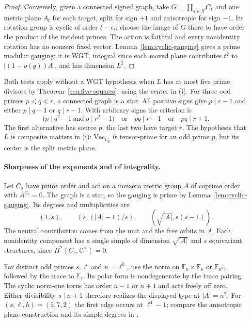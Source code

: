 \documentclass[11pt,a4paper]{article}
\numberwithin{equation}{section}
\theoremstyle{remark}
\renewcommand{\Vec}{\mathrm{Vec}}
\newcommand{\CC}{\mathbb C}
\begin{document}
\begin{proof}
Conversely, given a connected signed graph, take
$G=\prod_{s\in S}C_s$ and one metric plane $A_t$ for each target,
split for sign $+1$ and anisotropic for sign $-1$. Its rotation
group is cyclic of order $t-\epsilon_t$; choose the image of $G$
there to have order the product of the incident primes.
The action is faithful and every nonidentity rotation has no nonzero
fixed vector. Lemma~\ref{lem:cyclic-gauging} gives a prime modular
gauging; it is WGT, integral since each moved plane contributes
$t^2$ to $|(1-\rho(g))A|$, and has dimension $L^2$.
\end{proof}

Both tests apply without a WGT hypothesis when $L$ has at most five
prime divisors by Theorem~\ref{seq:five-squares}, using the center
in (i). For three odd primes $p<q<r$, a connected graph is a star.
All positive signs give $p\mid r-1$ and either $p\mid q-1$ or
$q\mid r-1$. With arbitrary signs the criterion is
\[
 \bigl(p\mid q^2-1\ \text{and}\ p\mid r^2-1\bigr)
 \quad\text{or}\quad pq\mid r-1\quad\text{or}\quad pq\mid r+1 .
\]
The first alternative has source $p$; the last two have target $r$.
The hypothesis that $L$ is composite matters in (i):
$\Vec_{C_p}$ is tensor-prime for an odd prime $p$, but its center is
the split metric plane.

\paragraph{Sharpness of the exponents and of integrality.}
Let $C_s$ have prime order and act on a nonzero metric group $A$ of
coprime order with $A^{C_s}=0$. The graph is a star, so the gauging
is prime by Lemma~\ref{lem:cyclic-gauging}. Its degrees and multiplicities are
\[
 (1,s),\qquad (s,(|A|-1)/s),\qquad (\sqrt{|A|},s(s-1)).
\]
The neutral contribution comes from the unit and the free orbits in
$A$. Each nonidentity component has a single simple of dimension
$\sqrt{|A|}$ and $s$ equivariant structures, since
$H^2(C_s,\CC^\times)=0$.

For distinct odd primes $s,\ell$ and $n=\ell^h$, use the norm on
$\mathbb F_n\times\mathbb F_n$ or $\mathbb F_{n^2}$, followed by
the trace to $\mathbb F_\ell$. Its polar form is nondegenerate by
the trace pairing. The cyclic norm-one torus has order $n-1$ or
$n+1$ and acts freely off zero. Either divisibility $s\mid n\pm1$
therefore realizes the displayed type at $|A|=n^2$. For
$(s,\ell,h)=(5,7,2)$ the first edge occurs at $\ell^4-1$; compare
the anisotropic plane construction and its simple degrees in
\cite[Definition~3.1 and Proposition~4.2]{GPR}.
\end{document}
